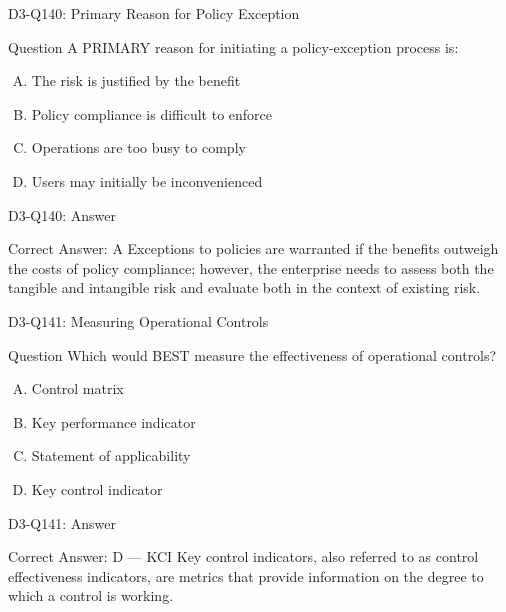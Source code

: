 \documentclass{beamer}
\begin{document}
	\begin{frame}{D3-Q140: Primary Reason for Policy Exception}
		\begin{block}{Question}
			A PRIMARY reason for initiating a policy-exception process is:
		\end{block}
		\begin{enumerate}[(A)]
			\item The risk is justified by the benefit
			\item Policy compliance is difficult to enforce
			\item Operations are too busy to comply
			\item Users may initially be inconvenienced
		\end{enumerate}
	\end{frame}
	\begin{frame}{D3-Q140: Answer}
		\begin{block}{Correct Answer: A}
			Exceptions to policies are warranted if the benefits outweigh the costs of policy compliance; however, the enterprise needs to assess both the tangible and intangible risk and evaluate both in the context of existing risk.
		\end{block}
	\end{frame}
	
	\begin{frame}{D3-Q141: Measuring Operational Controls}
		\begin{block}{Question}
			Which would BEST measure the effectiveness of operational controls?
		\end{block}
		\begin{enumerate}[(A)]
			\item Control matrix
			\item Key performance indicator
			\item Statement of applicability
			\item Key control indicator
		\end{enumerate}
	\end{frame}
	\begin{frame}{D3-Q141: Answer}
		\begin{block}{Correct Answer: D --- KCI}
			Key control indicators, also referred to as control effectiveness indicators, are metrics that provide information on the degree to which a control is working.
		\end{block}
	\end{frame}
	
\end{document}
